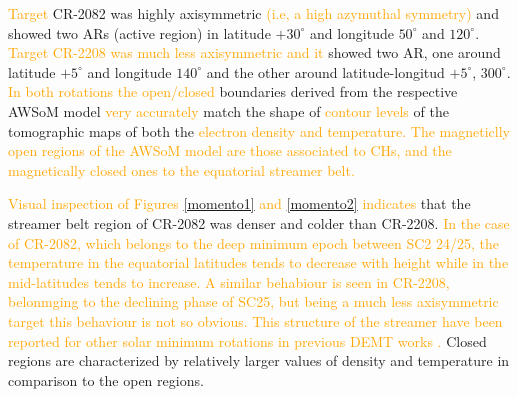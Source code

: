 \documentclass[namedreferences]{solarphysics}
\newcommand{\mdeg}{^\circ}
\def\albert#1{\textcolor{orange}{#1}}
\begin{document}
\begin{article}
\albert{Target} CR-2082 was highly axisymmetric \albert{(i.e, a high azymuthal symmetry)} and showed two ARs (active region) in latitude $+30\mdeg$ and longitude $50\mdeg$ and $120\mdeg$. \albert{Target CR-2208 was much less axisymmetric and it} showed two AR, one around latitude $+5\mdeg$ and longitude $140\mdeg$ and the other around latitude-longitud $+5\mdeg$, $300\mdeg$. \albert{In both rotations the open/closed} boundaries derived from the respective AWSoM model \albert{very accurately} match the shape of \albert{contour levels} of the tomographic maps of both the \albert{electron density and temperature. The magneticlly open regions of the AWSoM model are those associated to CHs, and the magnetically closed ones to the equatorial streamer belt.} 

\albert{Visual inspection of Figures \ref{momento1} and \ref{momento2} indicates} that the streamer belt region of CR-2082 was denser and colder than CR-2208. \albert{In the case of CR-2082, which belongs to the deep minimum epoch between SC2 24/25, the temperature in the equatorial latitudes tends to decrease with height while in the mid-latitudes tends to increase. A similar behabiour is seen in CR-2208, belonmging to the declining phase of SC25, but being a much less axisymmetric target this behaviour is not so obvious. This structure of the streamer have been reported for other solar minimum rotations in previous DEMT works \citep{lloveras_2017,nuevo_2013,vasquez_2010}.} Closed regions are characterized by relatively larger values of density and temperature in comparison to the open regions.


\end{article}
\end{document}
